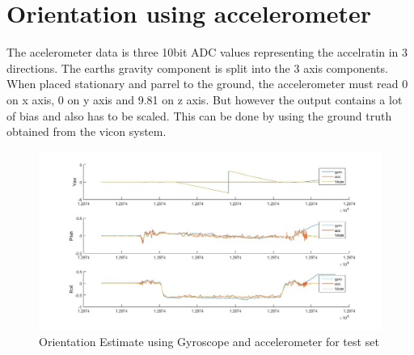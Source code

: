 \documentclass[fleqn,10pt]{SelfArx} %
\begin{document}
\section{Orientation using accelerometer}
\label{sec:acc}
The acelerometer data is three 10bit ADC values representing the accelratin in 3 directions. The earths gravity component is split into the 3 axis components. When placed stationary and parrel to the ground, the accelerometer must read 0 on x axis, 0 on y axis and 9.81 on z axis. But however the output contains a lot of bias and also has to be scaled. This can be done by using the ground truth obtained from the vicon system.

\begin{figure}[t]
\centering
\includegraphics[scale=0.4]{raw.jpg}
\caption{Orientation Estimate using Gyroscope and accelerometer for test set}
\label{fig:raw}
\end{figure}
\end{document}

